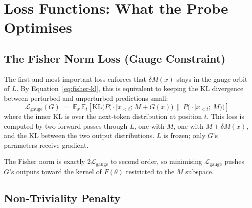 \documentclass[11pt, a4paper]{article}
\theoremstyle{plain}
\theoremstyle{definition}
\theoremstyle{remark}
\begin{document}
\section{Loss Functions: What the Probe Optimises}
\label{sec:losses-part2}

\subsection{The Fisher Norm Loss (Gauge Constraint)}

The first and most important loss enforces that $\delta M(x)$ stays in the gauge orbit of $L$.
By Equation~\ref{eq:fisher-kl}, this is equivalent to keeping the KL divergence between perturbed and unperturbed predictions small:
\begin{equation}
\mathcal{L}_{\text{gauge}}(G) \;=\; \mathbb{E}_{x}\,\mathbb{E}_{t}\!\left[ \mathrm{KL}\!\Big( P\!\big(\cdot \mid x_{<t};\, M + G(x)\big) \,\Big\|\, P\!\big(\cdot \mid x_{<t};\, M\big) \Big) \right]
\label{eq:gauge-loss}
\end{equation}
where the inner KL is over the next-token distribution at position $t$.
This loss is computed by two forward passes through $L$, one with $M$, one with $M + \delta M(x)$, and the KL between the two output distributions.
$L$ is frozen; only $G$'s parameters receive gradient.

The Fisher norm is exactly $2\mathcal{L}_{\text{gauge}}$ to second order, so minimising $\mathcal{L}_{\text{gauge}}$ pushes $G$'s outputs toward the kernel of $F(\theta)$ restricted to the $M$ subspace.

\subsection{Non-Triviality Penalty}
\end{document}
